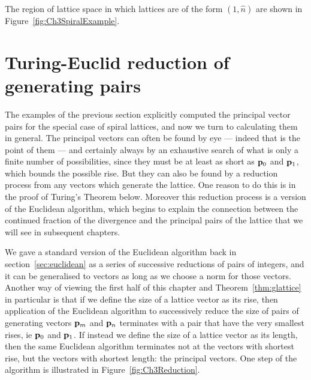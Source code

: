 \begin{jAnswer}
The region of lattice space in which lattices are of the form $(1,\hat{n})$ are shown in Figure~\ref{fig:Ch3SpiralExample}.

\end{jAnswer}
 
\clearpage
\section{Turing-Euclid reduction of generating pairs}
\label{sec:TEreduction}
The examples of the previous section explicitly computed the principal vector pairs for the special case of spiral lattices, and now we turn to calculating them in 
general. 
The principal vectors can often be found by eye --- indeed that is the point of them --- and certainly always by an exhaustive search of what is only a finite number of possibilities, since they must be at least as short as ${\mathbf p}_{0}$ and ${\mathbf p}_{1}$, which bounds the possible rise.
But they can also be found by a reduction process from any vectors which generate the lattice. One reason to do this is in the proof of Turing's Theorem below. Moreover this reduction process is a version of the Euclidean algorithm, which begins to explain the connection between the continued fraction of the divergence and the principal pairs of the lattice that we will see in subsequent chapters. 

We gave a standard version of the Euclidean algorithm back in section~\eqref{sec:euclidean} as a series of successive reductions of pairs of integers, and it can be generalised to vectors as long as we choose a norm for those vectors. Another way of viewing the first half of this chapter and Theorem~\ref{thm:glattice} in particular is that 
if we define the size of a lattice vector as its rise, then application of the Euclidean algorithm to successively reduce the size of pairs of generating  vectors ${\mathbf p}_{m}$ and ${\mathbf p}_{n}$  terminates with a pair that have the very smallest rises, ie ${\mathbf p}_{0}$ and ${\mathbf p}_{1}$. If instead we define the size of a lattice vector as its length, then the same Euclidean algorithm terminates not at the vectors with shortest rise, but the vectors with shortest length: the principal vectors. One step of the algorithm is illustrated in Figure~\ref{fig:Ch3Reduction}.


